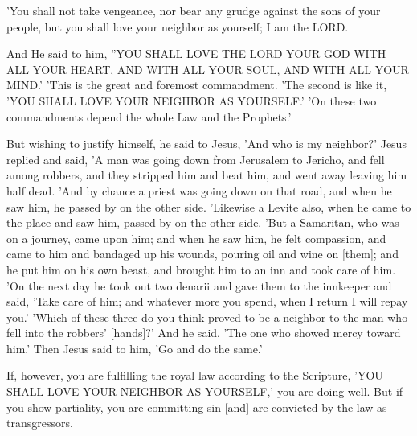 \begin{scripture}[Leviticus 19:18]
    'You shall not take vengeance, nor bear any grudge against the sons of your people, but you shall love your neighbor as yourself; I am the LORD.
\end{scripture}

\begin{scripture}[Matthew 22:37-40]
    And He said to him, ''YOU SHALL LOVE THE LORD YOUR GOD WITH ALL YOUR HEART, AND WITH ALL YOUR SOUL, AND WITH ALL YOUR MIND.'
    'This is the great and foremost commandment.
    'The second is like it, 'YOU SHALL LOVE YOUR NEIGHBOR AS YOURSELF.'
    'On these two commandments depend the whole Law and the Prophets.'
\end{scripture}

\begin{scripture}[Luke 10:29-37]
    But wishing to justify himself, he said to Jesus, 'And who is my neighbor?'
    Jesus replied and said, 'A man was going down from Jerusalem to Jericho, and fell among robbers, and they stripped him and beat him, and went away leaving him half dead.
    'And by chance a priest was going down on that road, and when he saw him, he passed by on the other side.
    'Likewise a Levite also, when he came to the place and saw him, passed by on the other side.
    'But a Samaritan, who was on a journey, came upon him; and when he saw him, he felt compassion,
    and came to him and bandaged up his wounds, pouring oil and wine on [them]; and he put him on his own beast, and brought him to an inn and took care of him.
    'On the next day he took out two denarii and gave them to the innkeeper and said, 'Take care of him; and whatever more you spend, when I return I will repay you.'
    'Which of these three do you think proved to be a neighbor to the man who fell into the robbers' [hands]?'
    And he said, 'The one who showed mercy toward him.' Then Jesus said to him, 'Go and do the same.'
\end{scripture}

\begin{scripture}[James 2:8-9]
    If, however, you are fulfilling the royal law according to the Scripture, 'YOU SHALL LOVE YOUR NEIGHBOR AS YOURSELF,' you are doing well.
    But if you show partiality, you are committing sin [and] are convicted by the law as transgressors.
\end{scripture}

